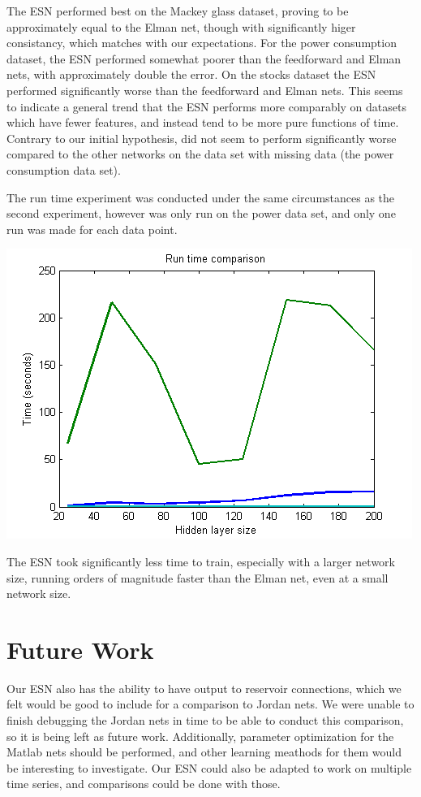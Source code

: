 \documentclass{acm_proc_article-sp}
\begin{document}
The ESN performed best on the Mackey glass dataset, proving to be approximately equal to the Elman net, though with significantly higer consistancy, which matches with our expectations. For the power consumption dataset, the ESN performed somewhat poorer than the feedforward and Elman nets, with approximately double the error. On the stocks dataset the ESN performed significantly worse than the feedforward and Elman nets. This seems to indicate a general trend that the ESN performs more comparably on datasets which have fewer features, and instead tend to be more pure functions of time. Contrary to our initial hypothesis, did not seem to perform significantly worse compared to the other networks on the data set with missing data (the power consumption data set). 

The run time experiment was conducted under the same circumstances as the second experiment, however was only run on the power data set, and only one run was made for each data point.

\includegraphics[scale=0.7]{time_plot.png}

The ESN took significantly less time to train, especially with a larger network size, running orders of magnitude faster than the Elman net, even at a small network size.

\section{Future Work}
Our ESN also has the ability to have output to reservoir connections, which we felt would be good to include for a comparison to Jordan nets. We were unable to finish debugging the Jordan nets in time to be able to conduct this comparison, so it is being left as future work. Additionally, parameter optimization for the Matlab nets should be performed, and other learning meathods for them would be interesting to investigate. Our ESN could also be adapted to work on multiple time series, and comparisons could be done with those.
\end{document}
